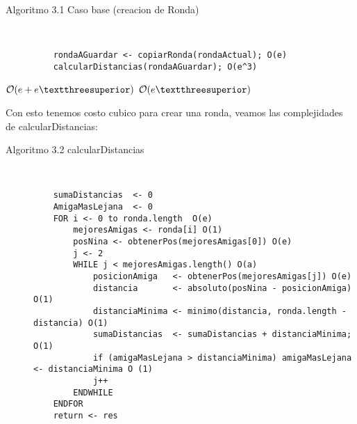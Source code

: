\begin{description}
  \item[Algoritmo 3.1 Caso base (creacion de Ronda)] \hfill \\
  \begin{verbatim}
    rondaAGuardar <- copiarRonda(rondaActual); O(e)
    calcularDistancias(rondaAGuardar); O(e^3)
   \end{verbatim}
\end{description}

\begin{center}
\newline
$ \bigO(e + e³) $ \newline \newline
$ \bigO(e³) $ \newline \newline
\end{center}
Con esto tenemos costo cubico para crear una ronda, veamos las complejidades de calcularDistancias: \newline

\begin{description}
  \item[Algoritmo 3.2 calcularDistancias] \hfill \\
  \begin{verbatim}
    sumaDistancias  <- 0
    AmigaMasLejana  <- 0 
    FOR i <- 0 to ronda.length  O(e)
        mejoresAmigas <- ronda[i] O(1)
        posNina <- obtenerPos(mejoresAmigas[0]) O(e)
        j <- 2
        WHILE j < mejoresAmigas.length() O(a)
            posicionAmiga   <- obtenerPos(mejoresAmigas[j]) O(e)
            distancia       <- absoluto(posNina - posicionAmiga) O(1)
            distanciaMinima <- minimo(distancia, ronda.length - distancia) O(1)
            sumaDistancias  <- sumaDistancias + distanciaMinima; O(1)
            if (amigaMasLejana > distanciaMinima) amigaMasLejana <- distanciaMinima O (1)
            j++
        ENDWHILE
    ENDFOR
    return <- res
    \end{verbatim}
\end{description}

